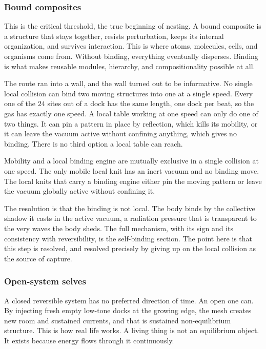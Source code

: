 \subsubsection{Bound composites}

This is the critical threshold, the true beginning of nesting. A bound composite is a structure that stays together, resists perturbation, keeps its internal organization, and survives interaction. This is where atoms, molecules, cells, and organisms come from. Without binding, everything eventually disperses. Binding is what makes reusable modules, hierarchy, and compositionality possible at all.

The route ran into a wall, and the wall turned out to be informative. No single local collision can bind two moving structures into one at a single speed. Every one of the $24$ sites out of a dock has the same length, one dock per beat, so the gas has exactly one speed. A local table working at one speed can only do one of two things. It can pin a pattern in place by reflection, which kills its mobility, or it can leave the vacuum active without confining anything, which gives no binding. There is no third option a local table can reach.

\begin{principle}
Mobility and a local binding engine are mutually exclusive in a single collision at one speed. The only mobile local knit has an inert vacuum and no binding move. The local knits that carry a binding engine either pin the moving pattern or leave the vacuum globally active without confining it.
\end{principle}

The resolution is that the binding is not local. The body binds by the collective shadow it casts in the active vacuum, a radiation pressure that is transparent to the very waves the body sheds. The full mechanism, with its sign and its consistency with reversibility, is the self-binding section. The point here is that this step is resolved, and resolved precisely by giving up on the local collision as the source of capture.

\subsubsection{Open-system selves}

A closed reversible system has no preferred direction of time. An open one can. By injecting fresh empty low-tone docks at the growing edge, the mesh creates new room and sustained currents, and that is sustained non-equilibrium structure. This is how real life works. A living thing is not an equilibrium object. It exists because energy flows through it continuously.

